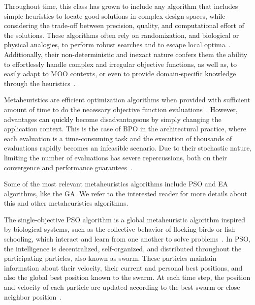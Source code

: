 	Throughout time, this class has grown to include any algorithm that includes simple heuristics to locate good solutions in complex design spaces, while considering the trade-off between precision, quality, and computational effort of the solutions. These algorithms often rely on randomization, and biological or physical analogies, to perform robust searches and to escape local optima~\cite{Glover2003Metaheuristics}. Additionally, their non-deterministic and inexact nature confers them the ability to effortlessly handle complex and irregular objective functions, as well as, to easily adapt to \ac{MOO} contexts, or even to provide domain-specific knowledge through the heuristics~\cite{Wortmann2017GABESTCHOICE}.
	
	Metaheuristics are efficient optimization algorithms when provided with sufficient amount of time to do the necessary objective function evaluations~\cite{Conn2009}. However, advantages can quickly become disadvantageous by simply changing the application context. This is the case of \ac{BPO} in the architectural practice, where each evaluation is a time-consuming task and the execution of thousands of evaluations rapidly becomes an infeasible scenario. Due to their stochastic nature, limiting the number of evaluations has severe repercussions, both on their convergence and performance guarantees~\cite{Hasancebi2009}. 
	
	Some of the most relevant metaheuristics algorithms include \ac{PSO} and \ac{EA} algorithms, like the \ac{GA}. We refer  to the interested reader for more details about this and other metaheuristics algorithms.
	
	The single-objective \ac{PSO} algorithm is a global metaheuristic algorithm inspired by biological systems, such as the collective behavior of flocking birds or fish schooling, which interact and learn from one another to solve problems~\cite{Brownlee2011}. In \ac{PSO}, the intelligence is decentralized, self-organized, and distributed throughout the participating particles, also known as swarm. These particles maintain information about their velocity, their current and personal best positions, and also the global best position known to the swarm. At each time step, the position and velocity of each particle are updated according to the best swarm or close neighbor position~\cite{Brownlee2011}.
	
